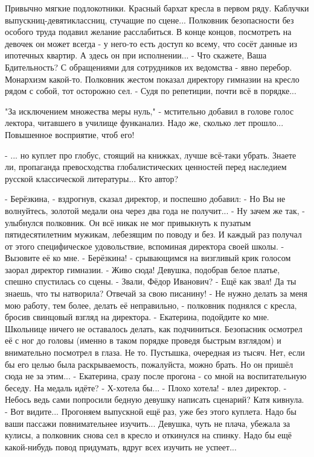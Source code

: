


Привычно мягкие подлокотники. Красный бархат кресла в первом ряду. Каблучки выпускниц-девятиклассниц, стучащие по сцене...
Полковник безопасности без особого труда подавил желание расслабиться. В конце концов, посмотреть на девочек он может всегда - у него-то есть доступ ко всему, что сосёт данные из ипотечных квартир. А здесь он при исполнении...
 - Что скажете, Ваша Бдительность?
С обращениями для сотрудников их ведомства - явно перебор. Монархизм какой-то. Полковник жестом показал директору гимназии на кресло рядом с собой, тот осторожно сел.
 - Судя по репетиции, почти всё в порядке...

"За исключением множества меры нуль," - мстительно добавил в голове голос лектора, читавшего в училище функанализ.
Надо же, сколько лет прошло... Повышенное восприятие, чтоб его!

 - ... но куплет про глобус, стоящий на книжках, лучше всё-таки убрать. Знаете ли, пропаганда превосходства глобалистических ценностей перед наследием русской классической литературы... Кто автор?

 - Берёзкина, - вздрогнув, сказал директор, и поспешно добавил: - Но Вы не волнуйтесь, золотой медали она через два года не получит...
 - Ну зачем же так, - улыбнулся полковник. Он всё никак не мог привыкнуть к пузатым пятидесятилетним мужикам, лебезящим по поводу и без. И каждый раз получал от этого специфическое удовольствие, вспоминая директора своей школы. - Вызовите её ко мне.
 - Берёзкина! - срывающимся на визгливый крик голосом заорал директор гимназии. - Живо сюда!
Девушка, подобрав белое платье, спешно спустилась со сцены.
 - Звали, Фёдор Иванович?
 - Ещё как звал! Да ты знаешь, что ты натворила? Отвечай за свою писанину!
 - Не нужно делать за меня мою работу, тем более, делать её неправильно, - полковник поднялся с кресла, бросив свинцовый взгляд на директора. - Екатерина, подойдите ко мне.
Школьнице ничего не оставалось делать, как подчиниться. Безопасник осмотрел её с ног до головы (именно в таком порядке проведя быстрым взглядом) и внимательно посмотрел в глаза. Не то. Пустышка, очередная из тысяч.
Нет, если бы его целью была раскрываемость, пожалуйста, можно брать. Но он пришёл сюда не за этим...
 - Екатерина, сразу после прогона - со мной на воспитательную беседу. На медаль идёте?
 - Х-хотела бы...
 - Плохо хотела! - влез директор.
 - Небось ведь сами попросили бедную девушку написать сценарий?
Катя кивнула.
 - Вот видите... Прогоняем выпускной ещё раз, уже без этого куплета. Надо бы ваши пассажи повнимательнее изучить...
Девушка, чуть не плача, убежала за кулисы, а полковник снова сел в кресло и откинулся на спинку. Надо бы ещё какой-нибудь повод придумать, вдруг всех изучить не успеет...


